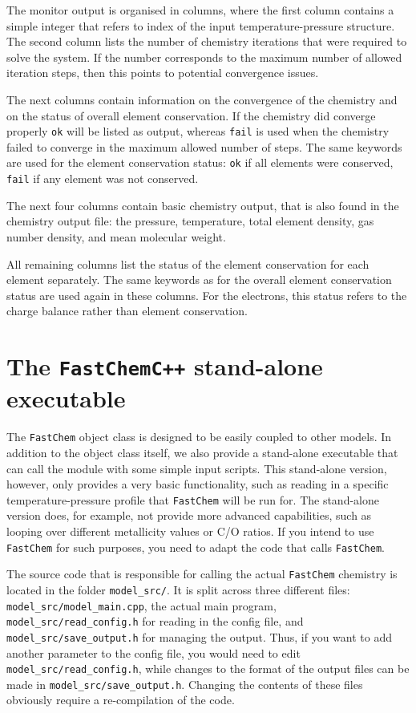 \documentclass[numbers=noenddot]{aux/fcmanual}
\newcommand{\fc}{\texttt{FastChem}\xspace}
\newcommand{\cpp}{\ttt{C++}\xspace}
\newcommand{\ttt}[1]{\texttt {#1}}
\begin{document}
The monitor output is organised in columns, where the first column contains a simple integer that refers to index of the input temperature-pressure structure. The second column lists the number of chemistry iterations that were required to solve the system. If the number corresponds to the maximum number of allowed iteration steps, then this points to potential convergence issues. 

The next columns contain information on the convergence of the chemistry and on the status of overall element conservation. If the chemistry did converge properly \verb|ok| will be listed as output, whereas \verb|fail| is used when the chemistry failed to converge in the maximum allowed number of steps. The same keywords are used for the element conservation status: \verb|ok| if all elements were conserved, \verb|fail| if any element was not conserved. 

The next four columns contain basic chemistry output, that is also found in the chemistry output file: the pressure, temperature, total element density, gas number density, and mean molecular weight.

All remaining columns list the status of the element conservation for each element separately. The same keywords as for the overall element conservation status are used again in these columns. For the electrons, this status refers to the charge balance rather than element conservation.




\chapter{The \fc \cpp stand-alone executable}

The \fc object class is designed to be easily coupled to other models. In addition to the object class itself, we also provide a stand-alone executable that can call the module with some simple input scripts. This stand-alone version, however, only provides a very basic functionality, such as reading in a specific temperature-pressure profile that \fc will be run for. The stand-alone version does, for example, not provide more advanced capabilities, such as looping over different metallicity values or C/O ratios. If you intend to use \fc for such purposes, you need to adapt the code that calls \fc.

The source code that is responsible for calling the actual \fc chemistry is located in the folder \verb|model_src/|. It is split across three different files: \verb|model_src/model_main.cpp|, the actual main program, \verb|model_src/read_config.h| for reading in the config file, and \verb|model_src/save_output.h| for managing the output. Thus, if you want to add another parameter to the config file, you would need to edit \verb|model_src/read_config.h|, while changes to the format of the output files can be made in \verb|model_src/save_output.h|. Changing the contents of these files obviously require a re-compilation of the code.
\end{document}
